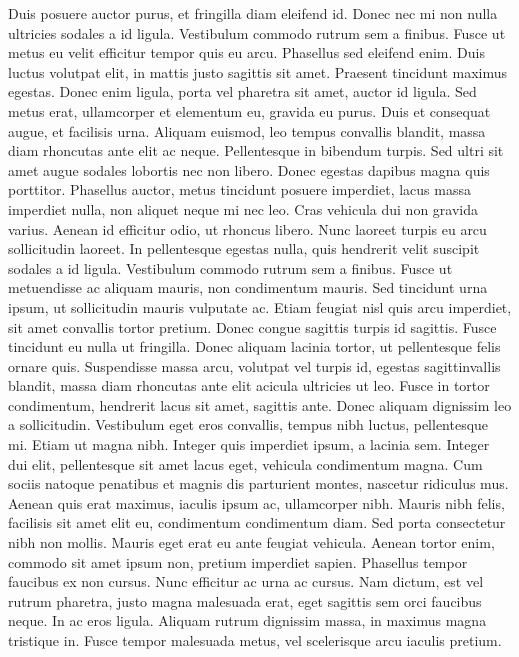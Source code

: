 \documentclass{article}
\begin{document}
{{ Duis posuere auctor purus, et fringilla diam eleifend id.
 Donec nec mi non nulla ultricies sodales a id ligula.
 Vestibulum commodo rutrum sem a finibus.
 Fusce ut metus eu velit efficitur tempor quis eu arcu.
 Phasellus sed eleifend enim.
 Duis luctus volutpat elit, in mattis justo sagittis sit amet.
 Praesent tincidunt maximus egestas.
 Donec enim ligula, porta vel pharetra sit amet, auctor id ligula.
 Sed metus erat, ullamcorper et elementum eu, gravida eu purus.
 Duis et consequat augue, et facilisis urna.
 Aliquam euismod, leo tempus convallis blandit, massa diam rhoncutas ante elit ac neque.
 Pellentesque in bibendum turpis.
 Sed ultri sit amet augue sodales lobortis nec non libero.
 Donec egestas dapibus magna quis porttitor.
 Phasellus auctor, metus tincidunt posuere imperdiet, lacus massa imperdiet nulla, non aliquet neque mi nec leo.
 Cras vehicula dui non gravida varius.
 Aenean id efficitur odio, ut rhoncus libero.
 Nunc laoreet turpis eu arcu sollicitudin laoreet.
 In pellentesque egestas nulla, quis hendrerit velit suscipit sodales a id ligula.
 Vestibulum commodo rutrum sem a finibus.
 Fusce ut metuendisse ac aliquam mauris, non condimentum mauris.
 Sed tincidunt urna ipsum, ut sollicitudin mauris vulputate ac.
 Etiam feugiat nisl quis arcu imperdiet, sit amet convallis tortor pretium.
 Donec congue sagittis turpis id sagittis.
 Fusce tincidunt eu nulla ut fringilla.
 Donec aliquam lacinia tortor, ut pellentesque felis ornare quis.
 Suspendisse massa arcu, volutpat vel turpis id, egestas sagittinvallis blandit, massa diam rhoncutas ante elit acicula ultricies ut leo.
 Fusce in tortor condimentum, hendrerit lacus sit amet, sagittis ante.
 Donec aliquam dignissim leo a sollicitudin.
 Vestibulum eget eros convallis, tempus nibh luctus, pellentesque mi.
 Etiam ut magna nibh.
 Integer quis imperdiet ipsum, a lacinia sem.
 Integer dui elit, pellentesque sit amet lacus eget, vehicula condimentum magna.
 Cum sociis natoque penatibus et magnis dis parturient montes, nascetur ridiculus mus.
 Aenean quis erat maximus, iaculis ipsum ac, ullamcorper nibh.
 Mauris nibh felis, facilisis sit amet elit eu, condimentum condimentum diam.
 Sed porta consectetur nibh non mollis.
 Mauris eget erat eu ante feugiat vehicula.
 Aenean tortor enim, commodo sit amet ipsum non, pretium imperdiet sapien.
 Phasellus tempor faucibus ex non cursus.
 Nunc efficitur ac urna ac cursus.
 Nam dictum, est vel rutrum pharetra, justo magna malesuada erat, eget sagittis sem orci faucibus neque.
 In ac eros ligula.
 Aliquam rutrum dignissim massa, in maximus magna tristique in.
 Fusce tempor malesuada metus, vel scelerisque arcu iaculis pretium.
}}
\end{document}
